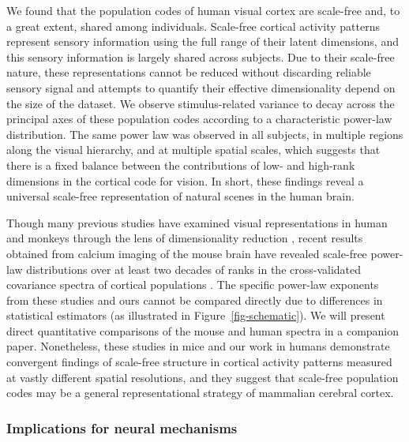 \documentclass[10pt]{article}
\begin{document}
We found that the population codes of human visual cortex are scale-free
and, to a great extent, shared among individuals. Scale-free cortical
activity patterns represent sensory information using the full range of
their latent dimensions, and this sensory information is largely shared
across subjects. Due to their scale-free nature, these representations
cannot be reduced without discarding reliable sensory signal and
attempts to quantify their effective dimensionality depend on the size
of the dataset. We observe stimulus-related variance to decay across the
principal axes of these population codes according to a characteristic
power-law distribution. The same power law was observed in all subjects,
in multiple regions along the visual hierarchy, and at multiple spatial
scales, which suggests that there is a fixed balance between the
contributions of low- and high-rank dimensions in the cortical code for
vision. In short, these findings reveal a universal scale-free
representation of natural scenes in the human brain.

Though many previous studies have examined visual representations in
human and monkeys through the lens of dimensionality reduction
\autocites[e.g.][]{Lehky2014,Khosla2022}, recent results obtained from
calcium imaging of the mouse brain have revealed scale-free power-law
distributions over at least two decades of ranks in the cross-validated
covariance spectra of cortical populations
\autocite{Stringer2019,Manley2024}. The specific power-law exponents
from these studies and ours cannot be compared directly due to
differences in statistical estimators (as illustrated in
Figure~\ref{fig-schematic}). We will present direct quantitative
comparisons of the mouse and human spectra in a companion paper.
Nonetheless, these studies in mice and our work in humans demonstrate
convergent findings of scale-free structure in cortical activity
patterns measured at vastly different spatial resolutions, and they
suggest that scale-free population codes may be a general
representational strategy of mammalian cerebral cortex.

\subsubsection{Implications for neural
mechanisms}\label{implications-for-neural-mechanisms}
\end{document}
